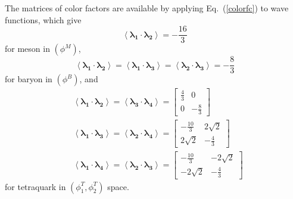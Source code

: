 \documentclass[prd,twocolumn,floatfix,nofootinbib]{revtex4}
\begin{document}
The matrices of color factors are available by applying Eq.~(\ref{colorfc}) to wave functions, which give
\begin{equation}\label{cfcM}
    \left\langle \boldsymbol{\lambda_{1}}\cdot \boldsymbol{\lambda_{2}} \right\rangle=-\frac{16}{3}
\end{equation}
for meson in $(\phi^{M})$,
\begin{equation}\label{cfcB}
    \left\langle \boldsymbol{\lambda_{1}}\cdot \boldsymbol{\lambda_{2}} \right\rangle=
    \left\langle \boldsymbol{\lambda_{1}}\cdot \boldsymbol{\lambda_{3}} \right\rangle=
    \left\langle \boldsymbol{\lambda_{2}}\cdot \boldsymbol{\lambda_{3}} \right\rangle=-\frac{8}{3}
\end{equation}
for baryon in $(\phi^{B})$, and
\begin{equation}\label{cfcT}
    \begin{aligned}
        &\left\langle \boldsymbol{\lambda_{1}}\cdot \boldsymbol{\lambda_{2}} \right\rangle=
        \left\langle \boldsymbol{\lambda_{3}}\cdot \boldsymbol{\lambda_{4}} \right\rangle=
        \begin{bmatrix}
            \frac{4}{3} & 0 \\
            0 & -\frac{8}{3}
        \end{bmatrix} \\ 
        &\left\langle \boldsymbol{\lambda_{1}}\cdot \boldsymbol{\lambda_{3}} \right\rangle=
        \left\langle \boldsymbol{\lambda_{2}}\cdot \boldsymbol{\lambda_{4}} \right\rangle=
        \begin{bmatrix}
            -\frac{10}{3} & 2\sqrt{2} \\
            2\sqrt{2} & -\frac{4}{3}
        \end{bmatrix} \\ 
        &\left\langle \boldsymbol{\lambda_{1}}\cdot \boldsymbol{\lambda_{4}} \right\rangle=
        \left\langle \boldsymbol{\lambda_{2}}\cdot \boldsymbol{\lambda_{3}} \right\rangle=
        \begin{bmatrix}
            -\frac{10}{3} & -2\sqrt{2} \\
            -2\sqrt{2} & -\frac{4}{3}
        \end{bmatrix}
    \end{aligned}
\end{equation}
for tetraquark in $(\phi_{1}^{T},\phi_{2}^{T})$ space.


\medskip
\end{document}
